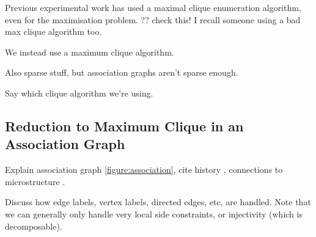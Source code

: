 \documentclass{llncs}
\begin{document}
Previous experimental work has used a maximal clique enumeration algorithm, even for the
maximisation problem. ?? check this! I recall someone using a bad max clique algorithm too.
\cite{DBLP:conf/sspr/BunkeFGSV02,DBLP:journals/jgaa/ConteFV07}

We instead use a maximum clique algorithm.

Also sparse stuff, but association graphs aren't sparse enough.

Say which clique algorithm we're using.

\subsection{Reduction to Maximum Clique in an Association Graph}

Explain association graph \cref{figure:association}, cite history \cite{LeviG}, connections to
microstructure \cite{DBLP:conf/aaai/Jegou93a}.

Discuss how edge labels, vertex labels, directed edges, etc, are handled. Note that we can generally
only handle very local side constraints, or injectivity (which is decomposable).
\end{document}
